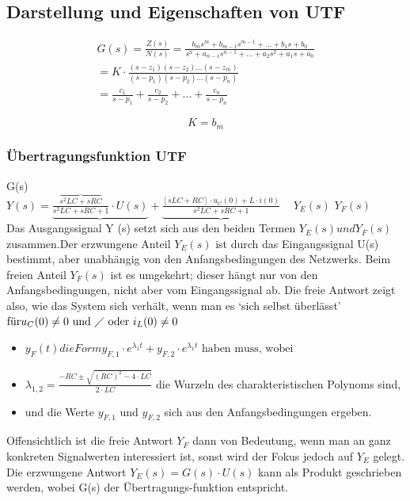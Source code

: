 \subsection{Darstellung und Eigenschaften von UTF}

\begin{eqnarray}
G(s)=\frac{Z(s)}{N(s)}=\frac{b_{m}s^m + b_{m-1}s^{m-1}+ ... + b_{1}s+b_{0}}{s^{n}+a_{n-1}s^{n-1} + ... + a_{2}s^{2}+a_{1}s + a_{0}} \\ = K\cdot \frac{(s-z_{1})(s-z_{2})...(s-z_{m})}{(s-p_{1})(s-p_{2})...(s-p_{n})} \\ = \frac{c_{1}}{s-p_{1}} + \frac{c_{2}}{s-p_{2}} + ...  + \frac{c_{n}}{s-p_{n}}
\end{eqnarray}

\begin{equation}
K=b_{m}
\end{equation}
\subsubsection{Übertragungsfunktion UTF}
\hspace{2.3cm}G(s)\\
$Y(s) = \underbrace{\frac{\overbrace{s^2 LC+sRC}}{s^2 LC +sRC +1}\cdot U(s)} + \underbrace{\frac{[sLC + RC] \cdot u_{C}(0) + L \cdot i(0)}{s^2 LC +sRC +1}}$ \newline
\textcolor{white}{x} \hspace{2.4cm} $Y_{E}(s)$ \hspace{3.8cm} $Y_{F}(s)$ \\
Das Ausgangssignal Y (s) setzt sich aus den beiden Termen $Y_{E}(s) und Y_{F}(s)$ zusammen.Der erzwungene Anteil $Y_{E}(s)$ ist durch das Eingangssignal U(s) bestimmt, aber unabhängig von den Anfangsbedingungen des Netzwerks.
Beim freien Anteil $Y_{F}(s)$ ist es umgekehrt; dieser hängt nur von den Anfangsbedingungen,
nicht aber vom Eingangssignal ab. Die freie Antwort zeigt also, wie
das System sich verhält, wenn man es ‘sich selbst überlässt’
$\text{für} u_{C}(0) \neq 0 \text{ und } \diagup \text{ oder } i_{L}(0) \neq 0$
\begin{itemize}
	\item $ y_{F}(t) die Form y_{F,1} \cdot e^{\lambda_{1}t} + y_{F,2} \cdot e^{\lambda_{1}t} \text{ haben muss, wobei}$
	\item $ \lambda_{1,2}= \frac{-RC \pm \sqrt{(RC)^2 - 4 \cdot LC} }{2 \cdot LC}$ die Wurzeln des charakteristischen Polynoms sind,
	\item und die Werte $y_{F,1} \text{ und } y_{F,2}$ sich aus den Anfangsbedingungen ergeben.
\end{itemize}
Offensichtlich ist die freie Antwort $Y_{F}$ dann von Bedeutung, wenn man an ganz konkreten
Signalwerten interessiert ist, sonst wird der Fokus jedoch auf $Y_{E}$ gelegt. \\
Die erzwungene Antwort $Y_{E}(s) = G(s) \cdot U(s)$ kann als Produkt geschrieben werden, wobei G(s) der Übertragungs-funktion entspricht.


